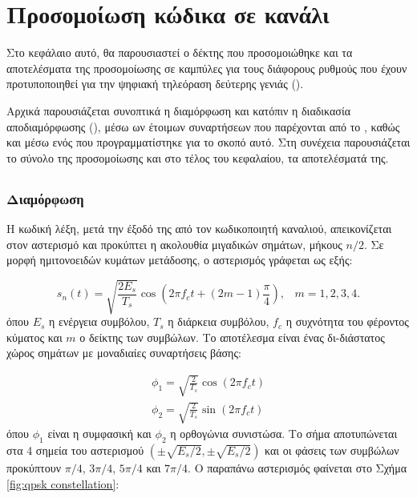 \chapter{Προσομοίωση  κώδικα σε κανάλι }

Στο κεφάλαιο αυτό, θα παρουσιαστεί ο δέκτης που προσομοιώθηκε και τα αποτελέσματα της προσομοίωσης σε καμπύλες  για τους διάφορους ρυθμούς που έχουν προτυποποιηθεί για την ψηφιακή τηλεόραση δεύτερης γενιάς ().

Αρχικά παρουσιάζεται συνοπτικά η διαμόρφωση  και κατόπιν η διαδικασία αποδιαμόρφωσης (), μέσω ων έτοιμων συναρτήσεων που παρέχονται από το , καθώς και μέσω ενός  που προγραμματίστηκε για το σκοπό αυτό. Στη συνέχεια παρουσιάζεται το σύνολο της προσομοίωσης και στο τέλος του κεφαλαίου, τα αποτελέσματά της.

\section{}
\subsection{Διαμόρφωση }
Η κωδική λέξη, μετά την έξοδό της από τον κωδικοποιητή καναλιού, απεικονίζεται στον  αστερισμό και προκύπτει η ακολουθία μιγαδικών σημάτων, μήκους $n/2$. Σε μορφή ημιτονοειδών κυμάτων μετάδοσης, ο  αστερισμός γράφεται ως εξής:

\begin{equation}
s_n(t)=\sqrt{\frac{2E_s}{T_s}}\cos\left(2{\pi}f_ct+(2m-1)\frac{\pi}{4}\right),\;\;\;m=1,2,3,4.
\label{eq:QPSK sinusoid waves}
\end{equation}
όπου $E_s$ η ενέργεια συμβόλου, $T_s$ η διάρκεια συμβόλου, $f_c$ η συχνότητα του φέροντος κύματος και $m$ ο δείκτης των συμβώλων. Το αποτέλεσμα είναι ένας δι-διάστατος χώρος σημάτων με μοναδιαίες συναρτήσεις βάσης:

\begin{equation}
\begin{aligned}
\phi_1=\sqrt{\frac{2}{T_s}}\cos(2{\pi}f_ct) \\ \phi_2=\sqrt{\frac{2}{T_s}}\sin(2{\pi}f_ct)
\end{aligned}
\label{eq:QPSK base functions}
\end{equation}
όπου $\phi_1$ είναι η συμφασική και $\phi_2$ η ορθογώνια συνιστώσα. Το σήμα αποτυπώνεται στα 4 σημεία του αστερισμού  $\left(\pm\sqrt{E_s/2},\pm\sqrt{E_s/2}\right)$ και οι φάσεις των συμβώλων προκύπτουν $\pi/4$, $3\pi/4$, $5\pi/4$ και $7\pi/4$. Ο παραπάνω αστερισμός φαίνεται στο Σχήμα \ref{fig:qpsk constellation}:

